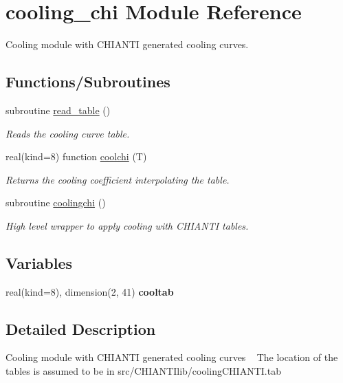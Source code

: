 \hypertarget{namespacecooling__chi}{}\section{cooling\+\_\+chi Module Reference}
\label{namespacecooling__chi}


Cooling module with C\+H\+I\+A\+N\+T\+I generated cooling curves.  


\subsection*{Functions/\+Subroutines}
\begin{DoxyCompactItemize}
\item 
subroutine \hyperlink{namespacecooling__chi_acdcfaea636dd68b666577d8daf434d35}{read\+\_\+table} ()
\begin{DoxyCompactList}\small\item\em Reads the cooling curve table. \end{DoxyCompactList}\item 
real(kind=8) function \hyperlink{namespacecooling__chi_a20c87eb43e4f324fa7d83fe9174fd767}{coolchi} (T)
\begin{DoxyCompactList}\small\item\em Returns the cooling coefficient interpolating the table. \end{DoxyCompactList}\item 
subroutine \hyperlink{namespacecooling__chi_a666df501be07ce1e3612d3c3796cf2a3}{coolingchi} ()
\begin{DoxyCompactList}\small\item\em High level wrapper to apply cooling with C\+H\+I\+A\+N\+T\+I tables. \end{DoxyCompactList}\end{DoxyCompactItemize}
\subsection*{Variables}
\begin{DoxyCompactItemize}
\item 
\hypertarget{namespacecooling__chi_a37baf8c1757edb98fcaa8b62587d7b2f}{}real(kind=8), dimension(2, 41) {\bfseries cooltab}\label{namespacecooling__chi_a37baf8c1757edb98fcaa8b62587d7b2f}

\end{DoxyCompactItemize}


\subsection{Detailed Description}
Cooling module with C\+H\+I\+A\+N\+T\+I generated cooling curves ~\newline
 The location of the tables is assumed to be in src/\+C\+H\+I\+A\+N\+T\+Ilib/cooling\+C\+H\+I\+A\+N\+T\+I.\+tab 

